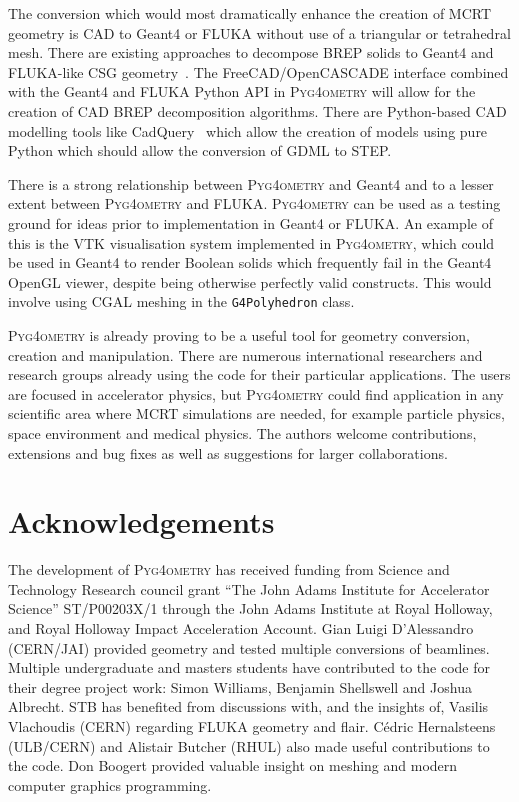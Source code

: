 \documentclass[final,5p,times,twocolumn]{elsarticle}
\newcommand{\pyinline}[1]{\lstinline[postbreak={}]{#1}}
\newcommand{\PYGEOMETRY}{\textsc{Pyg4ometry}}
\begin{document}
The conversion which would most dramatically enhance the creation of MCRT geometry is CAD to Geant4 or FLUKA
without use of a triangular or tetrahedral mesh. There are existing approaches to decompose BREP solids to Geant4 and
FLUKA-like CSG geometry~\cite{WangNuclSciTech31-82-2020, LuFusionEngineeringAndDesign124-2017}.
The FreeCAD/OpenCASCADE interface combined with the Geant4 and FLUKA Python API in \PYGEOMETRY{}
will allow for the creation of CAD BREP decomposition algorithms. There are Python-based CAD modelling tools like
CadQuery~\cite{cadquery} which allow the creation of models using pure Python which should allow the conversion of GDML to STEP.

There is a strong relationship between \PYGEOMETRY{} and Geant4 and to a lesser extent between
\PYGEOMETRY{} and FLUKA. \PYGEOMETRY{} can be used as a testing ground for ideas prior to
implementation in Geant4 or FLUKA. An example of this is the VTK visualisation system implemented in
\PYGEOMETRY{}, which could be used in Geant4 to render Boolean solids which frequently
fail in the Geant4 OpenGL viewer, despite being otherwise perfectly valid constructs.
This would involve using CGAL meshing in the \pyinline{G4Polyhedron} class. %

\PYGEOMETRY{} is already proving to be a useful tool for geometry conversion, creation and manipulation.
There are numerous international researchers and research groups already using the code for their particular applications.
The users are focused in accelerator physics, but \PYGEOMETRY{} could find application in any scientific
area where MCRT simulations are needed, for example particle physics, space environment and medical physics.
The authors welcome contributions, extensions and bug fixes as well as suggestions for larger collaborations.

\section{Acknowledgements}

The development of \PYGEOMETRY{} has received funding from Science and
Technology Research council grant ``The John Adams Institute for
Accelerator Science'' ST/P00203X/1 through the John Adams Institute at
Royal Holloway, and Royal Holloway Impact Acceleration Account. Gian Luigi D'Alessandro (CERN/JAI)
provided geometry and tested multiple conversions of beamlines. Multiple
undergraduate and masters students have contributed to the code for their
degree project work: Simon Williams, Benjamin Shellswell and Joshua Albrecht.
STB has benefited from discussions with, and the insights of, Vasilis Vlachoudis
(CERN) regarding FLUKA geometry and flair.  Cédric Hernalsteens (ULB/CERN) and
Alistair Butcher (RHUL) also made useful contributions to the code. Don Boogert
provided valuable insight on meshing and modern computer graphics programming.
\end{document}
